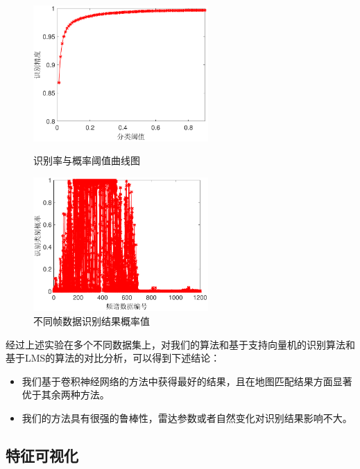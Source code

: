 \begin{figure}[H]
	\centering
	\begin{minipage}{7cm}
		\centering
		\includegraphics[width=6.67cm]{figures/othr/threashold}
		\caption{识别率与概率阈值曲线图}
		\label{fig:threshold}		
	\end{minipage}
	\hspace{10pt}
	\begin{minipage}{7cm}
		\centering
		\includegraphics[width=6.67cm]{figures/othr/prob}
		\caption{不同帧数据识别结果概率值}
		\label{fig:prob}
	\end{minipage}
	
\end{figure}

经过上述实验在多个不同数据集上，对我们的算法和基于支持向量机的识别算法和基于LMS的算法的对比分析，可以得到下述结论：
\begin{itemize}
	\item 我们基于卷积神经网络的方法中获得最好的结果，且在地图匹配结果方面显著优于其余两种方法。
	\item 我们的方法具有很强的鲁棒性，雷达参数或者自然变化对识别结果影响不大。
\end{itemize}

\subsection{特征可视化}

